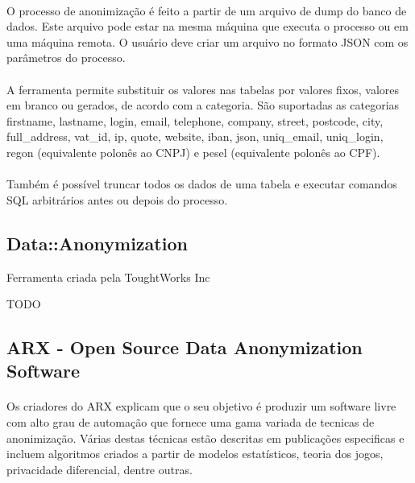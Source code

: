 \paragraph{} O processo de anonimização é feito a partir de um arquivo de dump do banco de dados. Este arquivo pode estar na mesma máquina que executa o processo ou em uma máquina remota. O usuário deve criar um arquivo no formato JSON com os parâmetros do processo.

\paragraph{} A ferramenta permite substituir os valores nas tabelas por valores fixos, valores em branco ou gerados, de acordo com a categoria. São suportadas as categorias firstname, lastname, login, email, telephone, company, street, postcode, city, full{\_}address, vat{\_}id, ip, quote, website, iban, json, uniq{\_}email, uniq{\_}login, regon (equivalente polonês ao CNPJ) e pesel (equivalente polonês ao CPF). 

\paragraph{} Também é possível truncar todos os dados de uma tabela e executar comandos SQL arbitrários antes ou depois do processo.

\subsection{Data::Anonymization}

Ferramenta criada pela ToughtWorks Inc\cite{data-anon-repository}

TODO

\subsection{ARX - Open Source Data Anonymization Software}

\paragraph{} Os criadores do ARX\cite{arx-repository} explicam que o seu objetivo é produzir um software livre com alto grau de automação que fornece uma gama variada de tecnicas de anonimização. Várias destas técnicas estão descritas em publicações especificas e incluem algoritmos criados a partir de modelos estatísticos, teoria dos jogos, privacidade diferencial, dentre outras.

